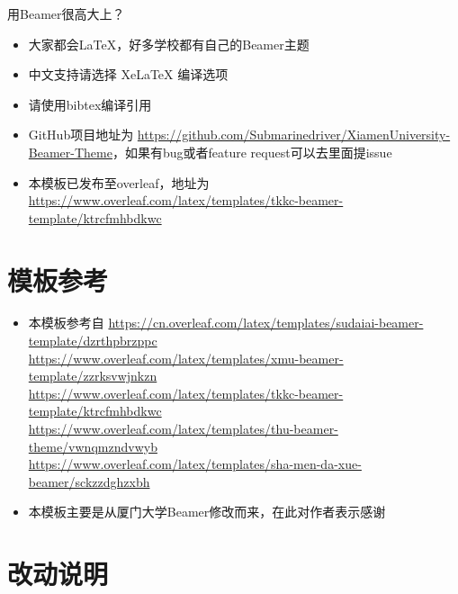 \documentclass{beamer}
\begin{document}
\begin{frame}{用Beamer很高大上？}
    \begin{itemize}[<+-| alert@+>] %
        \item 大家都会\LaTeX{}，好多学校都有自己的\textrm{Beamer}主题
        \item 中文支持请选择 Xe\LaTeX{} 编译选项
        \item 请使用bibtex编译引用
        \item GitHub项目地址为 \href{https://github.com/Submarinedriver/XiamenUniversity-Beamer-Theme}{https://github.com/Submarinedriver/XiamenUniversity-Beamer-Theme}，如果有bug或者feature request可以去里面提issue
        \item 本模板已发布至overleaf，地址为 \href{https://www.overleaf.com/latex/templates/tkkc-beamer-template/ktrcfmhbdkwc}{https://www.overleaf.com/latex/templates/tkkc-beamer-template/ktrcfmhbdkwc}
    \end{itemize}
\end{frame}


\section{模板参考}

\begin{frame}
    \begin{itemize}[<+->]
		\item 本模板参考自 \url{https://cn.overleaf.com/latex/templates/sudaiai-beamer-template/dzrthpbrzppc}\cite{origin1}\\
		\url{https://www.overleaf.com/latex/templates/xmu-beamer-template/zzrksvwjnkzn}\cite{origin2}\\
		\url{https://www.overleaf.com/latex/templates/tkkc-beamer-template/ktrcfmhbdkwc}\cite{origin3}\\
		\url{https://www.overleaf.com/latex/templates/thu-beamer-theme/vwnqmzndvwyb}\cite{origin4}\\
		\url{https://www.overleaf.com/latex/templates/sha-men-da-xue-beamer/sckzzdghzxbh}\cite{origin5}
		\item 本模板主要是从厦门大学Beamer修改而来，在此对作者表示感谢
    \end{itemize}
\end{frame}


\section{改动说明}
\end{document}
